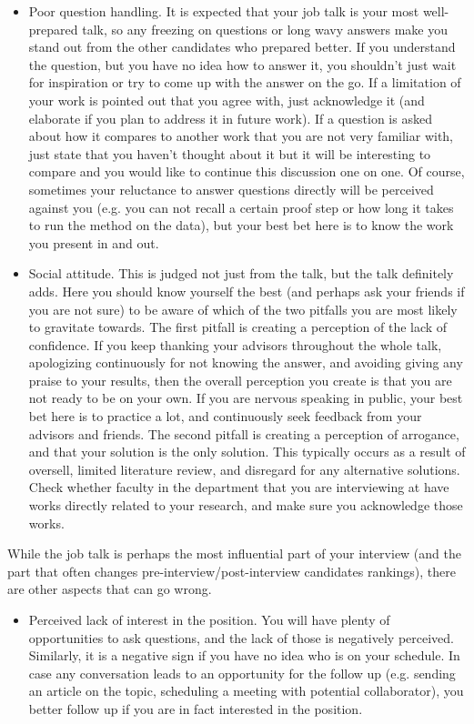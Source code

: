 \documentclass{article}
\begin{document}
{\begin{itemize}
\item Poor question handling. It is expected that your job talk is your most well-prepared talk, so any freezing on questions or long wavy answers make you stand out from the other candidates who prepared better. If you understand the question, but you have no idea how to answer it, you shouldn't just wait for inspiration or try to come up with the answer on the go. If a limitation of your work is pointed out that you agree with, just acknowledge it (and elaborate if you plan to address it in future work). If a question is asked about how it compares to another work that you are not very familiar with, just state that you haven't thought about it but it will be interesting to compare and you would like to continue this discussion one on one. Of course, sometimes your reluctance to answer questions directly will be perceived against you (e.g. you can not recall a certain proof step or how long it takes to run the method on the data), but your best bet here is to know the work you present in and out.

\item Social attitude. This is judged not just from the talk, but the talk definitely adds. Here you should know yourself the best (and perhaps ask your friends if you are not sure) to be aware of which of the two pitfalls you are most likely to gravitate towards. The first pitfall is creating a perception of the lack of confidence. If you keep thanking your advisors throughout the whole talk, apologizing continuously for not knowing the answer, and avoiding giving any praise to your results, then the overall perception you create is that you are not ready to be on your own. If you are nervous speaking in public, your best bet here is to practice a lot, and continuously seek feedback from your advisors and friends.  The second pitfall is creating a perception of arrogance, and that your solution is the only solution. This typically occurs as a result of oversell, limited literature review, and disregard for any alternative solutions. Check whether faculty in the department that you are interviewing at have works directly related to your research, and make sure you acknowledge those works.
\end{itemize}

While the job talk is perhaps the most influential part of your interview (and the part that often changes pre-interview/post-interview candidates rankings), there are other aspects that can go wrong.

\begin{itemize}
\item Perceived lack of interest in the position. You will have plenty of opportunities to ask questions, and the lack of those is negatively perceived. Similarly, it is a negative sign if you have no idea who is on your schedule. In case any conversation leads to an opportunity for the follow up (e.g. sending an article on the topic, scheduling a meeting with potential collaborator), you better follow up if you are in fact interested in the position.




\end{itemize}}
\end{document}

